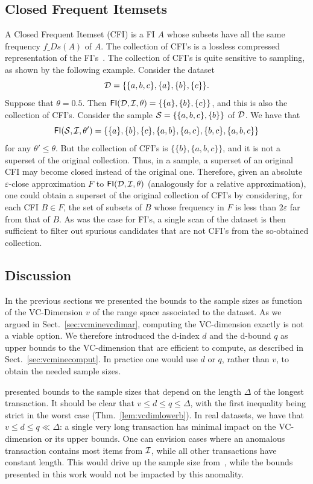 \subsection{Closed Frequent Itemsets}\label{sec:vcmineclosed}
A Closed Frequent Itemset (CFI) is a FI $A$ whose subsets have all the same frequency
$f\_Ds(A)$ of $A$. The collection of CFI's is a lossless compressed
representation of the FI's~\citep{CaldersRB06}. The collection of CFI's is quite
sensitive to sampling, as shown by the following example. Consider the %
dataset 
\[
  {\cal D}=\{\{a,b,c\}, \{a\}, \{b\}, \{c\}\}
  .
\]
Suppose that $\theta=0.5$. Then $\mathsf{FI}({\cal D},{\cal I},\theta)=\{
\{a\},\{b\},\{c\}\}$, and this is also the collection of CFI's. Consider the sample
${\cal S}=\{\{a,b,c\},\{b\}\}$ of ${\cal D}$. We have that
\[
\mathsf{FI}({\cal S},{\cal I},\theta')=\{\{a\},\{b\},\{c\},\{a,b\},\{a,c\},\{b,c\},\{a,b,c\}\}
\]
for any $\theta'\le\theta$. But the collection of CFI's is
$\{\{b\},\{a,b,c\}\}$, and it is not a superset of the original collection. Thus, in a
sample, a superset of an original CFI may become closed instead of the original one.
Therefore, given an absolute $\varepsilon$-close approximation $F$ to
$\mathsf{FI}({\cal D},{\cal I},\theta)$ (analogously for a relative approximation), one could
obtain a superset of the original collection of CFI's by considering, for each
CFI $B\in F$, the set of subsets of $B$ whose frequency in $F$ is less than
$2\varepsilon$ far from that of $B$. As was the case for FI's, a single scan of
the dataset is then sufficient to filter out spurious candidates that are not
CFI's from the so-obtained collection.

\subsection{Discussion}\label{sec:vcminediscussion}
In the previous sections we presented the bounds to the sample sizes as function
of the VC-Dimension $v$ of the range space associated to the dataset. As we argued
in Sect.~\ref{sec:vcminevcdimar}, computing the VC-dimension exactly is not a viable
option. We therefore introduced the d-index $d$ and the d-bound $q$ as upper
bounds to the VC-dimension that are efficient to compute, as described in
Sect.~\ref{sec:vcminecomput}. In practice one would use $d$ or $q$, rather than $v$,
to obtain the needed sample sizes. 

\citet{ChakaravarthyPS09} presented bounds to the sample sizes that depend on
the length $\Delta$ of the longest transaction. It should be clear that $v\le
d\le q \le \Delta$, with the first inequality being strict in the worst case
(Thm.~\ref{lem:vcdimlowerb}). In real datasets, we have that $v\le d\le q\ll
\Delta$: a single very long transaction has minimal impact on the VC-dimension
or its upper bounds. One can envision cases where an anomalous transaction
contains most items from ${\cal I}$, while all other transactions have constant
length. This would drive up the sample size from~\citep{ChakaravarthyPS09}, while
the bounds presented in this work would not be impacted by this anomality.


